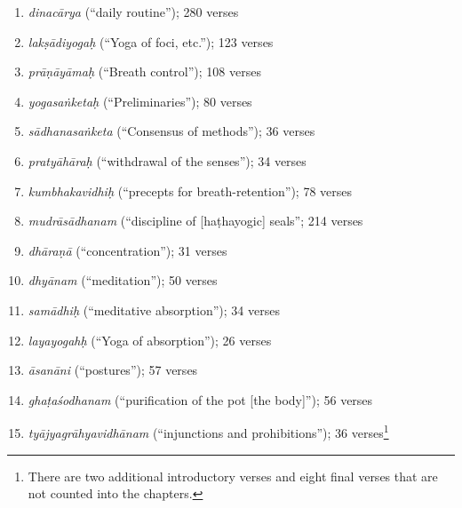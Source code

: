\begin{enumerate}
\item \textit{dinacārya} (``daily routine''); 280 verses
\item \textit{lakṣādiyogaḥ} (``Yoga of foci, etc.''); 123 verses
\item \textit{prāṇāyāmaḥ} (``Breath control''); 108 verses
\item \textit{yogasaṅketaḥ} (``Preliminaries''); 80 verses
\item \textit{sādhanasaṅketa} (``Consensus of methods''); 36 verses
\item \textit{pratyāhāraḥ} (``withdrawal of the senses''); 34 verses
\item \textit{kumbhakavidhiḥ} (``precepts for breath-retention''); 78 verses
\item \textit{mudrāsādhanam} (``discipline of [haṭhayogic] seals''; 214 verses
\item \textit{dhāraṇā} (``concentration''); 31 verses
\item \textit{dhyānam} (``meditation''); 50 verses
\item \textit{samādhiḥ} (``meditative absorption''); 34 verses
\item \textit{layayogahḥ} (``Yoga of absorption''); 26 verses
\item \textit{āsanāni} (``postures''); 57 verses
\item \textit{ghaṭaśodhanam} (``purification of the pot [the body]''); 56 verses
\item \textit{tyājyagrāhyavidhānam} (``injunctions and prohibitions''); 36 verses\footnote{There are two additional introductory verses and eight final verses that are not counted into the chapters.}
\end{enumerate}

